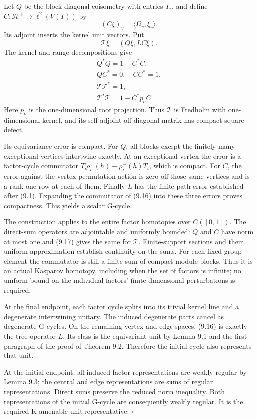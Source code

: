 \documentclass[
  11pt,
]{article}
\begin{document}
Let \(Q\) be the block diagonal coisometry with entries \(T_v\), and
define \(C:\mathscr H^+\to\ell^2(V(T))\) by \[
(C\xi)_v=\langle\Omega_v,\xi_v\rangle.
\tag{9.15}
\] Its adjoint inserts the kernel unit vectors. Put \[
\mathscr T\xi=(Q\xi,LC\xi).
\tag{9.16}
\] The kernel and range decompositions give \[
\begin{gathered}
Q^*Q=1-C^*C,\\
QC^*=0,\quad CC^*=1,\\
\mathscr T\mathscr T^*=1,\\
\mathscr T^*\mathscr T=1-C^*p_oC.
\end{gathered}
\tag{9.17}
\] Here \(p_o\) is the one-dimensional root projection. Thus
\(\mathscr T\) is Fredholm with one-dimensional kernel, and its
self-adjoint off-diagonal matrix has compact square defect.

Its equivariance error is compact. For \(Q\), all blocks except the
finitely many exceptional vertices intertwine exactly. At an exceptional
vertex the error is a factor-cycle commutator
\(T_i\rho_i^+(h)-\rho_i^-(h)T_i\), which is compact. For \(C\), the
error against the vertex permutation action is zero off those same
vertices and is a rank-one row at each of them. Finally \(L\) has the
finite-path error established after (9.1). Expanding the commutator of
(9.16) into these three errors proves compactness. This yields a scalar
G-cycle.

The construction applies to the entire factor homotopies over
\(C([0,1])\). The direct-sum operators are adjointable and uniformly
bounded: \(Q\) and \(C\) have norm at most one and (9.17) gives the same
for \(\mathscr T\). Finite-support sections and their uniform
approximation establish continuity on the sums. For each fixed group
element the commutator is still a finite sum of compact module blocks.
Thus it is an actual Kasparov homotopy, including when the set of
factors is infinite; no uniform bound on the individual factors'
finite-dimensional perturbations is required.

At the final endpoint, each factor cycle splits into its trivial kernel
line and a degenerate intertwining unitary. The induced degenerate parts
cancel as degenerate G-cycles. On the remaining vertex and edge spaces,
(9.16) is exactly the tree operator \(L\). Its class is the equivariant
unit by Lemma 9.1 and the first paragraph of the proof of Theorem 9.2.
Therefore the initial cycle also represents that unit.

At the initial endpoint, all induced factor representations are weakly
regular by Lemma 9.3; the central and edge representations are sums of
regular representations. Direct sums preserve the reduced norm
inequality. Both representations of the initial G-cycle are consequently
weakly regular. It is the required K-amenable unit representative.
\(\square\)
\end{document}
